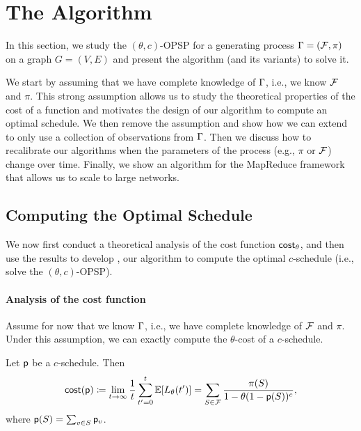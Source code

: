 \section{The \algonamebasecaps{} Algorithm}\label{sec:method}
In this section, we study the $(\theta,c)$-OPSP for a generating process
$\Gamma=(\mathcal{F},\pi)$ on a graph $G=(V,E)$ and present the algorithm \algoname
(and its variants) to solve it.

We start by assuming that we have complete knowledge of $\Gamma$, i.e., we know
$\mathcal{F}$ and $\pi$. This strong assumption allows us to study the theoretical
properties of the cost of a function and motivates the design of our algorithm
\algoname to compute an optimal schedule. We then remove the assumption and show
how we can extend \algoname to only use a collection of observations from
$\Gamma$. Then we discuss how to recalibrate our algorithms when the parameters of
the process (e.g., $\pi$ or $\mathcal{F}$) change over time.  Finally, we show an
algorithm for the MapReduce framework that allows us to scale to large networks.

\subsection{Computing the Optimal Schedule}\label{sec:optimize}
We now first conduct a theoretical analysis of the cost function $\mathsf{cost}_\theta$,
and then use the results to develop \algoname, our algorithm to compute the
optimal $c$-schedule (i.e., solve the $(\theta,c)$-OPSP).

\paragraph{Analysis of the cost function}
Assume for now that we know $\Gamma$, i.e., we have complete knowledge of
$\mathcal{F}$ and $\pi$. Under this assumption, we can exactly compute the
$\theta$-cost of a $c$-schedule.

\begin{lemma}\label{lem:explicit}
Let $\mathsf{p}$ be a $c$-schedule. Then
\begin{equation}\label{eq:explicit}
	\mathsf{cost}(\mathsf{p}) \coloneqq
	\lim_{t\rightarrow\infty}\frac{1}{t}\sum_{t'=0}^t\mathbb{E}[L_\theta(t')] =
	\sum_{S\in \mathcal{F}} \frac{\pi(S)}{1- \theta(1-\mathsf{p}(S))^c},
\end{equation}
where $\mathsf{p}(S) = \sum_{v\in S} \mathsf{p}_v$.
\end{lemma}

